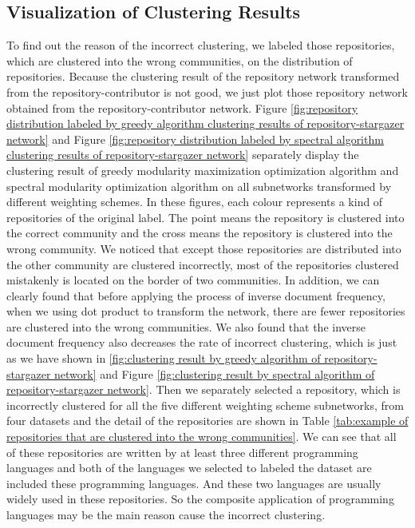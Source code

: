 \documentclass[12pt,oneside,final]{vlsithesis}
\begin{document}
\subsection{Visualization of Clustering Results}
To find out the reason of the incorrect clustering, we labeled those repositories, which are clustered into the wrong communities, on the distribution of repositories. Because the clustering result of the repository network transformed from the repository-contributor is not good, we just plot those repository network obtained from the repository-contributor network. Figure \ref {fig:repository distribution labeled by greedy algorithm clustering results of repository-stargazer network} and Figure \ref{fig:repository distribution labeled by spectral algorithm clustering results of repository-stargazer network} separately display the clustering result of greedy modularity maximization optimization algorithm and spectral modularity optimization algorithm on all subnetworks transformed by different weighting schemes. In these figures, each colour represents a kind of repositories of the original label. The point means the repository is clustered into the correct community and the cross means the repository is clustered into the wrong community. We noticed that except those repositories are distributed into the other community are clustered incorrectly, most of the repositories clustered mistakenly is located on the border of two communities. In addition, we can clearly found that before applying the process of inverse document frequency, when we using dot product to transform the network, there are fewer repositories are clustered into the wrong communities. We also found that the inverse document frequency also decreases the rate of incorrect clustering, which is just as we have shown in \ref{fig:clustering result by greedy algorithm of repository-stargazer network} and Figure \ref{fig:clustering result by spectral algorithm of repository-stargazer network}. Then we separately selected a repository, which is incorrectly clustered for all the five different weighting scheme subnetworks, from four datasets and the detail of the repositories are shown in Table \ref{tab:example of repositories that are clustered into the wrong communities}. We can see that all of these repositories are written by at least three different programming languages and both of the languages we selected to labeled the dataset are included these programming languages. And these two languages are usually widely used in these repositories. So the composite application of programming languages may be the main reason cause the incorrect clustering.
\end{document}
